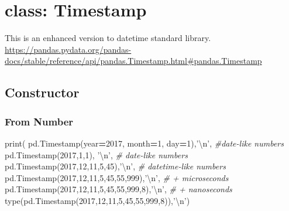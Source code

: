 \documentclass[
]{book}
\newenvironment{Shaded}{\begin{snugshade}}{\end{snugshade}}
\newcommand{\BuiltInTok}[1]{#1}
\newcommand{\CharTok}[1]{\textcolor[rgb]{0.5,0.5,0.5}{#1}}
\newcommand{\CommentTok}[1]{\textcolor[rgb]{0.37,0.37,0.37}{\textit{#1}}}
\newcommand{\DecValTok}[1]{\textcolor[rgb]{0.06,0.06,0.06}{#1}}
\newcommand{\NormalTok}[1]{#1}
\newcommand{\OperatorTok}[1]{\textcolor[rgb]{0.43,0.43,0.43}{\textbf{#1}}}
\newcommand{\StringTok}[1]{\textcolor[rgb]{0.5,0.5,0.5}{#1}}
\begin{document}
\hypertarget{class-timestamp}{%
\section{class: Timestamp}\label{class-timestamp}}

This is an enhanced version to datetime standard library.\\
\url{https://pandas.pydata.org/pandas-docs/stable/reference/api/pandas.Timestamp.html\#pandas.Timestamp}

\hypertarget{constructor-8}{%
\subsection{Constructor}\label{constructor-8}}

\hypertarget{from-number}{%
\subsubsection{From Number}\label{from-number}}

\begin{Shaded}
\begin{Highlighting}[]
\BuiltInTok{print}\NormalTok{( pd.Timestamp(year}\OperatorTok{=}\DecValTok{2017}\NormalTok{, month}\OperatorTok{=}\DecValTok{1}\NormalTok{, day}\OperatorTok{=}\DecValTok{1}\NormalTok{),}\StringTok{'}\CharTok{\textbackslash{}n}\StringTok{'}\NormalTok{,  }\CommentTok{#date-like numbers}
\NormalTok{       pd.Timestamp(}\DecValTok{2017}\NormalTok{,}\DecValTok{1}\NormalTok{,}\DecValTok{1}\NormalTok{), }\StringTok{'}\CharTok{\textbackslash{}n}\StringTok{'}\NormalTok{,                  }\CommentTok{# date-like numbers}
\NormalTok{       pd.Timestamp(}\DecValTok{2017}\NormalTok{,}\DecValTok{12}\NormalTok{,}\DecValTok{11}\NormalTok{,}\DecValTok{5}\NormalTok{,}\DecValTok{45}\NormalTok{),}\StringTok{'}\CharTok{\textbackslash{}n}\StringTok{'}\NormalTok{,            }\CommentTok{# datetime-like numbers}
\NormalTok{       pd.Timestamp(}\DecValTok{2017}\NormalTok{,}\DecValTok{12}\NormalTok{,}\DecValTok{11}\NormalTok{,}\DecValTok{5}\NormalTok{,}\DecValTok{45}\NormalTok{,}\DecValTok{55}\NormalTok{,}\DecValTok{999}\NormalTok{),}\StringTok{'}\CharTok{\textbackslash{}n}\StringTok{'}\NormalTok{,     }\CommentTok{# + microseconds}
\NormalTok{       pd.Timestamp(}\DecValTok{2017}\NormalTok{,}\DecValTok{12}\NormalTok{,}\DecValTok{11}\NormalTok{,}\DecValTok{5}\NormalTok{,}\DecValTok{45}\NormalTok{,}\DecValTok{55}\NormalTok{,}\DecValTok{999}\NormalTok{,}\DecValTok{8}\NormalTok{),}\StringTok{'}\CharTok{\textbackslash{}n}\StringTok{'}\NormalTok{,   }\CommentTok{# + nanoseconds}
       \BuiltInTok{type}\NormalTok{(pd.Timestamp(}\DecValTok{2017}\NormalTok{,}\DecValTok{12}\NormalTok{,}\DecValTok{11}\NormalTok{,}\DecValTok{5}\NormalTok{,}\DecValTok{45}\NormalTok{,}\DecValTok{55}\NormalTok{,}\DecValTok{999}\NormalTok{,}\DecValTok{8}\NormalTok{)),}\StringTok{'}\CharTok{\textbackslash{}n}\StringTok{'}\NormalTok{)}
\end{Highlighting}
\end{Shaded}
\end{document}
